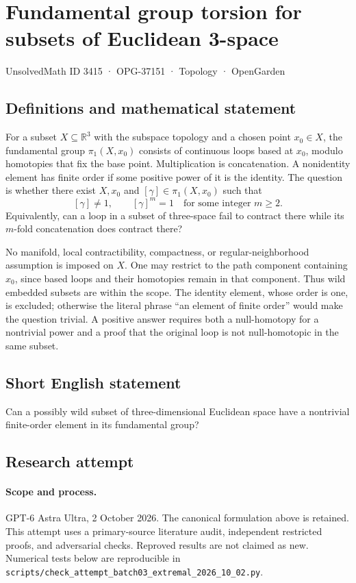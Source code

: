 \documentclass[11pt,a4paper]{article}
\begin{document}
\section*{Fundamental group torsion for subsets of Euclidean 3-space}\label{3415}
{\small UnsolvedMath ID 3415 · OPG-37151 · Topology · OpenGarden}
\subsection{Definitions and mathematical statement}
For a subset $X\subseteq\mathbb R^3$ with the subspace topology and
a chosen point $x_0\in X$, the fundamental group $\pi_1(X,x_0)$
consists of continuous loops based at $x_0$, modulo homotopies that
fix the base point. Multiplication is concatenation. A nonidentity
element has finite order if some positive power of it is the identity.
The question is whether there exist $X,x_0$ and $[\gamma]\in\pi_1(X,x_0)$
such that
\[
                     [\gamma]\ne1,\qquad [\gamma]^m=1
                        \quad\text{for some integer }m\ge2.
\]
Equivalently, can a loop in a subset of three-space fail to contract
there while its $m$-fold concatenation does contract there?

No manifold, local contractibility, compactness, or regular-neighborhood
assumption is imposed on $X$. One may restrict to the path component
containing $x_0$, since based loops and their homotopies remain in
that component. Thus wild embedded subsets are within the scope.
The identity element, whose order is one, is excluded; otherwise
the literal phrase ``an element of finite order'' would make the
question trivial. A positive answer requires both a null-homotopy
for a nontrivial power and a proof that the original loop is not
null-homotopic in the same subset.
\subsection{Short English statement}
Can a possibly wild subset of three-dimensional Euclidean space have a nontrivial finite-order element in its fundamental group?
\subsection{Research attempt}
\paragraph{Scope and process.}
GPT-6 Astra Ultra, 2 October 2026. The canonical formulation above is retained. This attempt uses a primary-source literature audit, independent restricted proofs, and adversarial checks. Reproved results are not claimed as new. Numerical tests below are reproducible in \texttt{scripts/check\_attempt\_batch03\_extremal\_2026\_10\_02.py}.
\end{document}
